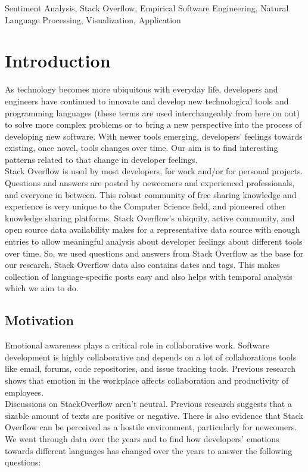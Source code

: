 \documentclass[conference]{IEEEtran}
\begin{document}
\begin{IEEEkeywords}
Sentiment Analysis, Stack Overflow, Empirical Software Engineering, Natural Language Processing, Visualization, Application
\end{IEEEkeywords}

\section{Introduction}
As technology becomes more ubiquitous with everyday life, developers and engineers have continued to innovate and develop new technological tools and programming languages (these terms are used interchangeably from here on out) to solve more complex problems or to bring a new perspective into the process of developing new software. With newer tools emerging, developers' feelings towards existing, once novel, tools changes over time. Our aim is to find interesting patterns related to that change in developer feelings. \\

Stack Overflow is used by most developers, for work and/or for personal projects. Questions and answers are posted by newcomers and experienced professionals, and everyone in between. This robust community of free sharing knowledge and experience is very unique to the Computer Science field, and pioneered other knowledge sharing platforms. Stack Overflow's ubiquity, active community, and open source data availability makes for a representative data source with enough entries to allow meaningful analysis about developer feelings about different tools over time. So, we used questions and answers from Stack Overflow as the base for our research. Stack Overflow data also contains dates and tags. This makes collection of language-specific posts easy and also helps with temporal analysis which we aim to do.

\subsection{Motivation}
Emotional awareness plays a critical role in collaborative work. Software development is highly collaborative and depends on a lot of collaborations tools like email, forums, code repositories, and issue tracking tools\cite{b1}. Previous research shows that emotion in the workplace affects collaboration and productivity of employees\cite{b2}. \\

Discussions on StackOverflow aren't neutral. Previous research suggests that a sizable amount of texts are positive or negative\cite{b3, b4, b5}. There is also evidence that Stack Overflow can be perceived as a hostile environment, particularly for newcomers\cite{b6}. We went through data over the years and to find how developers' emotions towards different languages has changed over the years to answer the following questions:\\
\end{document}
